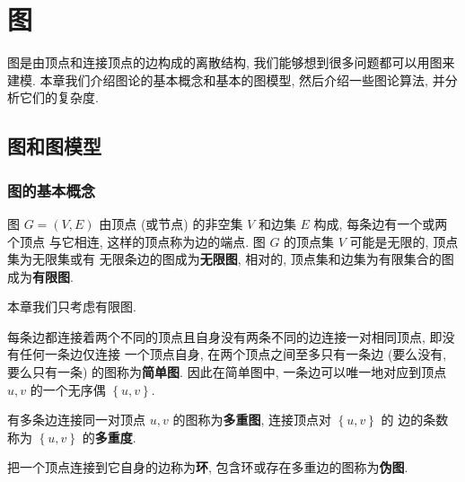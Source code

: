 \documentclass[10pt,UTF8]{book} %
\begin{document}

    



\newpage
\thispagestyle{empty}

\chapter{图}

图是由顶点和连接顶点的边构成的离散结构, 我们能够想到很多问题都可以用图来建模.
本章我们介绍图论的基本概念和基本的图模型, 然后介绍一些图论算法, 并分析它们的复杂度.

\section{图和图模型}

\subsection{图的基本概念}

\begin{definition}
    图 $G = (V, E)$ 由顶点 (或节点) 的非空集 $V$ 和边集 $E$ 构成, 每条边有一个或两个顶点
    与它相连, 这样的顶点称为边的端点.
    图 $G$ 的顶点集 $V$ 可能是无限的, 顶点集为无限集或有
    无限条边的图成为\textbf{无限图}, 相对的, 顶点集和边集为有限集合的图成为\textbf{有限图}.
\end{definition}

本章我们只考虑有限图.

每条边都连接着两个不同的顶点且自身没有两条不同的边连接一对相同顶点, 即没有任何一条边仅连接
一个顶点自身, 在两个顶点之间至多只有一条边 (要么没有, 要么只有一条) 的图称为\textbf{简单图}.
因此在简单图中, 一条边可以唯一地对应到顶点 $u, v$ 的一个无序偶 $\left\{ u, v \right\}$.

有多条边连接同一对顶点 $u, v$ 的图称为\textbf{多重图}, 连接顶点对 $\left\{ u, v \right\}$ 的
边的条数称为 $\left\{ u, v \right\}$ 的\textbf{多重度}.

把一个顶点连接到它自身的边称为\textbf{环}, 包含环或存在多重边的图称为\textbf{伪图}.
\end{document}
